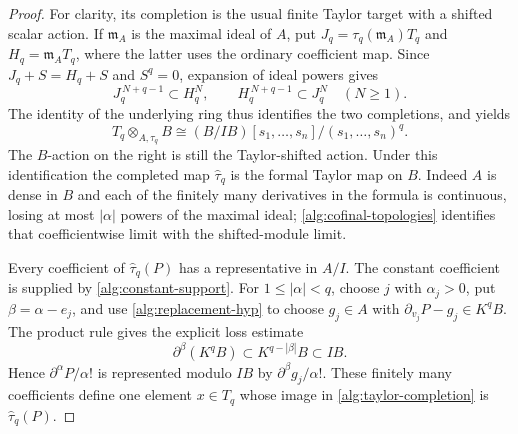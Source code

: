 \begin{proof}
For clarity, its completion is the usual finite Taylor target with a
shifted scalar action. If $\mathfrak m_A$ is the maximal ideal of $A$,
put $J_q=\tau_q(\mathfrak m_A)T_q$ and
$H_q=\mathfrak m_AT_q$, where the latter uses the ordinary coefficient
map. Since $J_q+S=H_q+S$ and $S^q=0$, expansion of ideal powers gives
\begin{equation}
 J_q^{\,N+q-1}\subset H_q^N,\qquad
 H_q^{\,N+q-1}\subset J_q^N
 \quad(N\geq1).
 \label{alg:cofinal-topologies}
\end{equation}
The identity of the underlying ring thus identifies the two completions,
and yields
\begin{equation}
 T_q\otimes_{A,\tau_q}B
 \cong (B/IB)[s_1,\ldots,s_n]/(s_1,\ldots,s_n)^q.
 \label{alg:taylor-completion}
\end{equation}
The $B$-action on the right is still the Taylor-shifted action.
Under this identification the completed map $\widehat\tau_q$ is the
formal Taylor map on $B$. Indeed $A$ is dense in $B$ and each of the
finitely many derivatives in the formula is continuous, losing at most
$|\alpha|$ powers of the maximal ideal; \eqref{alg:cofinal-topologies}
identifies that coefficientwise limit with the shifted-module limit.

Every coefficient of $\widehat\tau_q(P)$ has a representative in $A/I$.
The constant coefficient is supplied by
\eqref{alg:constant-support}. For $1\leq|\alpha|<q$, choose $j$ with
$\alpha_j>0$, put $\beta=\alpha-e_j$, and use
\eqref{alg:replacement-hyp} to choose $g_j\in A$ with
$\partial_{v_j}P-g_j\in K^qB$. The product rule gives the explicit
loss estimate
\begin{equation}
 \partial^\beta(K^qB)\subset K^{q-|\beta|}B\subset IB.
 \label{alg:derivative-loss}
\end{equation}
Hence $\partial^\alpha P/\alpha!$ is represented modulo $IB$ by
$\partial^\beta g_j/\alpha!$. These finitely many coefficients define
one element $x\in T_q$ whose image in
\eqref{alg:taylor-completion} is $\widehat\tau_q(P)$.


\end{proof}
